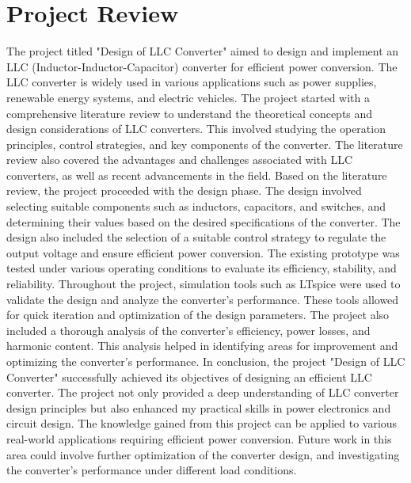 \section{Project Review}
The project titled "Design of LLC Converter" aimed to design and implement an LLC (Inductor-Inductor-Capacitor) converter for efficient power conversion. The LLC converter is widely used in various applications such as power supplies, renewable energy systems, and electric vehicles.
The project started with a comprehensive literature review to understand the theoretical concepts and design considerations of LLC converters. This involved studying the operation principles, control strategies, and key components of the converter. The literature review also covered the advantages and challenges associated with LLC converters, as well as recent advancements in the field.
Based on the literature review, the project proceeded with the design phase. The design involved selecting suitable components such as inductors, capacitors, and switches, and determining their values based on the desired specifications of the converter. The design also included the selection of a suitable control strategy to regulate the output voltage and ensure efficient power conversion.
The existing prototype was tested under various operating conditions to evaluate its efficiency, stability, and reliability.
Throughout the project, simulation tools such as LTspice were used to validate the design and analyze the converter's performance. These tools allowed for quick iteration and optimization of the design parameters.
The project also included a thorough analysis of the converter's efficiency, power losses, and harmonic content. This analysis helped in identifying areas for improvement and optimizing the converter's performance.
In conclusion, the project "Design of LLC Converter" successfully achieved its objectives of designing an efficient LLC converter. The project not only provided a deep understanding of LLC converter design principles but also enhanced my practical skills in power electronics and circuit design. The knowledge gained from this project can be applied to various real-world applications requiring efficient power conversion.
Future work in this area could involve further optimization of the converter design, and investigating the converter's performance under different load conditions.